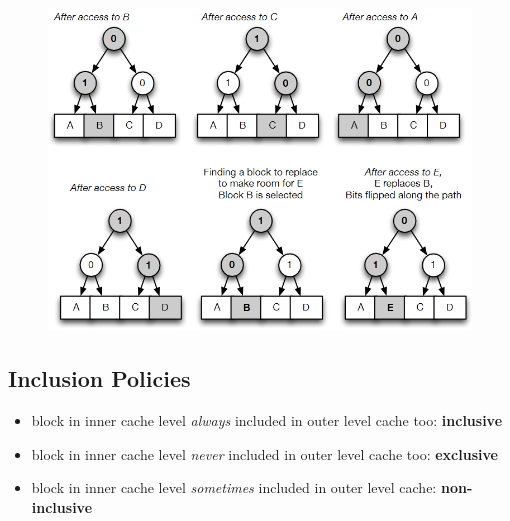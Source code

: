 \documentclass[12pt]{extarticle}
\begin{document}
	\begin{figure}[ht!]
		\centering
		\includegraphics[scale=0.7]{assets/plru-walkthrough.png}
	\end{figure}

	\subsection{Inclusion Policies}

	\begin{itemize}
		\item block in inner cache level \textit{always} included in outer level cache too: \textbf{inclusive}
		\item block in inner cache level \textit{never} included in outer level cache too: \textbf{exclusive}
		\item block in inner cache level \textit{sometimes} included in outer level cache: \textbf{non-inclusive}
	\end{itemize}
\end{document}
